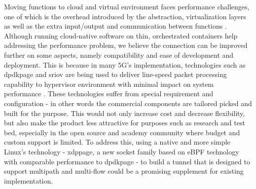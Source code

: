 Moving functions to cloud and virtual environment faces performance challenges, one of which is the overhead introduced by the abstraction, virtualization layers as well as the extra input/output and communication between functions \cite{yousaf_nfv_sdn_key_techno_for_5g2017}.
Although running cloud-native software on thin, orchestrated containers help addressing the performance problem, we believe the connection can be improved further on some aspects, namely compatibility and ease of development and deployment.
This is because in many 5G's implementation, technologies such as \ac{dpdkpage} and \ac{sriov} are being used to deliver line-speed packet processing capability to hypervisor environment with minimal impact on system performance \cite{intel_dpdk_perf}\cite{nec_hite_paper_upf_perf}\cite{openstack_sriov}\cite{zte_5g_core_upf_impl}.
These technologies suffer from special requirement and configuration - in other words the commercial components are tailored picked and built for the purpose.
This would not only increase cost and decrease flexibility, but also make the product less attractive for purposes such as research and test bed, especially in the open source and academy community where budget and custom support is limited.
To address this, using a native and more simple Linux's technology - \ac{xdppage}, a new socket family based on eBPF technology with comparable performance to \ac{dpdkpage} - to build a tunnel that is designed to support multipath and multi-flow could be a promising supplement for existing implementation. 
\\

